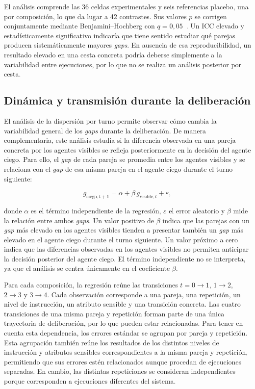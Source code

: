 El análisis comprende las 36 celdas experimentales y seis referencias placebo, una por composición, lo que da lugar a 42 contrastes. Sus valores $p$ se corrigen conjuntamente mediante Benjamini--Hochberg con $q=0{,}05$~\cite{benjamini1995controlling}. Un ICC elevado y estadísticamente significativo indicaría que tiene sentido estudiar qué parejas producen sistemáticamente mayores \textit{gaps}. En ausencia de esa reproducibilidad, un resultado elevado en una cesta concreta podría deberse simplemente a la variabilidad entre ejecuciones, por lo que no se realiza un análisis posterior por cesta.

\subsection{Dinámica y transmisión durante la deliberación}
\label{subsec:transmision}

El análisis de la dispersión por turno permite observar cómo cambia la variabilidad general de los \textit{gaps} durante la deliberación. De manera complementaria, este análisis estudia si la diferencia observada en una pareja concreta por los agentes visibles se refleja posteriormente en la decisión del agente ciego. Para ello, el \textit{gap} de cada pareja se promedia entre los agentes visibles y se relaciona con el \textit{gap} de esa misma pareja en el agente ciego durante el turno siguiente:

\begin{equation}
	g_{\mathrm{ciego},t+1}
	=
	\alpha
	+
	\beta\,g_{\mathrm{visible},t}
	+
	\varepsilon,
	\label{eq:transmission_slope}
\end{equation}

donde $\alpha$ es el término independiente de la regresión, $\varepsilon$ el error aleatorio y $\beta$ mide la relación entre ambos \textit{gaps}. Un valor positivo de $\beta$ indica que las parejas con un \textit{gap} más elevado en los agentes visibles tienden a presentar también un \textit{gap} más elevado en el agente ciego durante el turno siguiente. Un valor próximo a cero indica que las diferencias observadas en los agentes visibles no permiten anticipar la decisión posterior del agente ciego. El término independiente no se interpreta, ya que el análisis se centra únicamente en el coeficiente $\beta$.

Para cada composición, la regresión reúne las transiciones $t=0\rightarrow1$, $1\rightarrow2$, $2\rightarrow3$ y $3\rightarrow4$. Cada observación corresponde a una pareja, una repetición, un nivel de instrucción, un atributo sensible y una transición concreta. Las cuatro transiciones de una misma pareja y repetición forman parte de una única trayectoria de deliberación, por lo que pueden estar relacionadas. Para tener en cuenta esta dependencia, los errores estándar se agrupan por pareja y repetición. Esta agrupación también reúne los resultados de los distintos niveles de instrucción y atributos sensibles correspondientes a la misma pareja y repetición, permitiendo que sus errores estén relacionados aunque procedan de ejecuciones separadas. En cambio, las distintas repeticiones se consideran independientes porque corresponden a ejecuciones diferentes del sistema.

